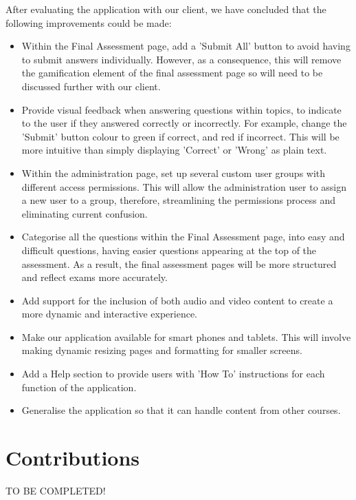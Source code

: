 \documentclass{l3proj}
\begin{document}
After evaluating the application with our client, we have concluded that the following improvements could be made:

\begin{itemize}
\item Within the Final Assessment page, add a 'Submit All' button to avoid having to submit answers individually. However, as a consequence, this will remove the gamification element of the final assessment page so will need to be discussed further with our client.
\item Provide visual feedback when answering questions within topics, to indicate to the user if they answered correctly or incorrectly. For example, change the 'Submit' button colour to green if correct, and red if incorrect. This will be more intuitive than simply displaying 'Correct' or 'Wrong' as plain text.
\item Within the administration page, set up several custom user groups with different access permissions. This will allow the administration user to assign a new user to a group, therefore, streamlining the permissions process and eliminating current confusion.
\item Categorise all the questions within the Final Assessment page, into easy and difficult questions, having easier questions appearing at the top of the assessment. As a result, the final assessment pages will be more structured and reflect exams more accurately.
\item Add support for the inclusion of both audio and video content to create a more dynamic and interactive experience.
\item Make our application available for smart phones and tablets. This will involve making dynamic resizing pages and formatting for smaller screens.
\item Add a Help section to provide users with 'How To' instructions for each function of the application.
\item Generalise the application so that it can handle content from other courses. 
\end{itemize}

\section{Contributions}

TO BE COMPLETED!
\end{document}
